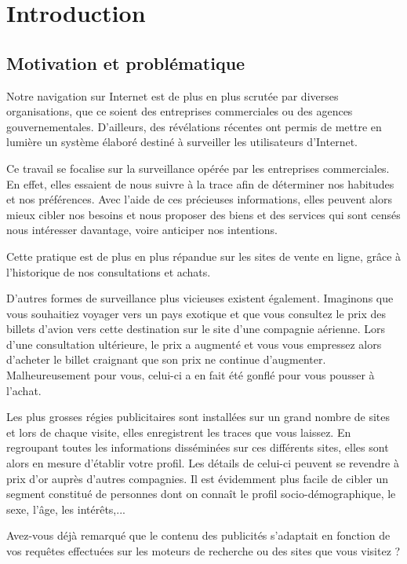 \chapter{Introduction}
\section{Motivation et problématique}
Notre navigation sur Internet est de plus en plus scrutée par diverses organisations, que ce soient des entreprises commerciales ou des agences gouvernementales. D'ailleurs, des révélations récentes \cite{WikipediaFR_RES} ont permis de mettre en lumière un système élaboré destiné à surveiller les utilisateurs d'Internet.

Ce travail se focalise sur la surveillance opérée par les entreprises commerciales. En effet, elles essaient de nous suivre à la trace afin de déterminer nos habitudes et nos préférences. Avec l'aide de ces précieuses informations, elles peuvent alors mieux cibler nos besoins et nous proposer des biens et des services qui sont censés nous intéresser davantage, voire anticiper nos intentions\cite{MD1}.

Cette pratique est de plus en plus répandue sur les sites de vente en ligne, grâce à l'historique de nos consultations et achats.

D'autres formes de surveillance plus vicieuses existent également. Imaginons que vous souhaitiez voyager vers un pays exotique et que vous consultez le prix des billets d'avion vers cette destination sur le site d'une compagnie aérienne. Lors d'une consultation ultérieure, le prix a augmenté et vous vous empressez alors d'acheter le billet craignant que son prix ne continue d'augmenter. Malheureusement pour vous, celui-ci a en fait été gonflé pour vous pousser à l'achat.

Les plus grosses régies publicitaires sont installées sur un grand nombre de sites et lors de chaque visite, elles enregistrent les traces que vous laissez. En regroupant toutes les informations disséminées sur ces différents sites, elles sont alors en mesure d'établir votre profil. Les détails de celui-ci peuvent se revendre à prix d'or auprès d'autres compagnies. Il est évidemment plus facile de cibler un segment constitué de personnes dont on connaît le profil socio-démographique, le sexe, l'âge, les intérêts,...

Avez-vous déjà remarqué que le contenu des publicités s'adaptait en fonction de vos requêtes effectuées sur les moteurs de recherche ou des sites que vous visitez ?


